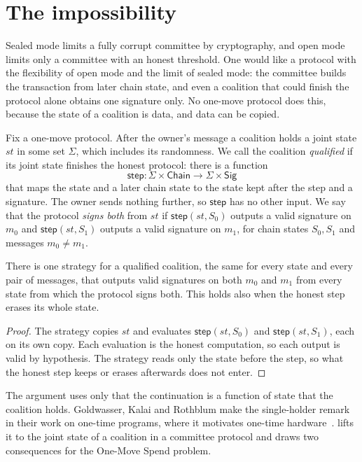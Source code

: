 \section{The impossibility}\label{sec:impossibility}

Sealed mode limits a fully corrupt committee by cryptography, and open mode limits only a committee with an honest threshold. One would like a protocol with the flexibility of open mode and the limit of sealed mode: the committee builds the transaction from later chain state, and even a coalition that could finish the protocol alone obtains one signature only. No one-move protocol does this, because the state of a coalition is data, and data can be copied.

Fix a one-move protocol. After the owner's message a coalition holds a joint state $st$ in some set $\Sigma$, which includes its randomness. We call the coalition \emph{qualified} if its joint state finishes the honest protocol: there is a function
\[
  \mathsf{step} : \Sigma \times \mathsf{Chain} \to \Sigma \times \mathsf{Sig}
\]
that maps the state and a later chain state to the state kept after the step and a signature. The owner sends nothing further, so $\mathsf{step}$ has no other input. We say that the protocol \emph{signs both} from $st$ if $\mathsf{step}(st, S_0)$ outputs a valid signature on $m_0$ and $\mathsf{step}(st, S_1)$ outputs a valid signature on $m_1$, for chain states $S_0, S_1$ and messages $m_0 \neq m_1$.

\begin{theorem}\label{thm:imposs}
There is one strategy for a qualified coalition, the same for every state and every pair of messages, that outputs valid signatures on both $m_0$ and $m_1$ from every state from which the protocol signs both. This holds also when the honest step erases its whole state.
\end{theorem}

\begin{proof}
The strategy copies $st$ and evaluates $\mathsf{step}(st, S_0)$ and $\mathsf{step}(st, S_1)$, each on its own copy. Each evaluation is the honest computation, so each output is valid by hypothesis. The strategy reads only the state before the step, so what the honest step keeps or erases afterwards does not enter.
\end{proof}

The argument uses only that the continuation is a function of state that the coalition holds. Goldwasser, Kalai and Rothblum make the single-holder remark in their work on one-time programs, where it motivates one-time hardware~\cite{GKR08}.  lifts it to the joint state of a coalition in a committee protocol and draws two consequences for the One-Move Spend problem.

